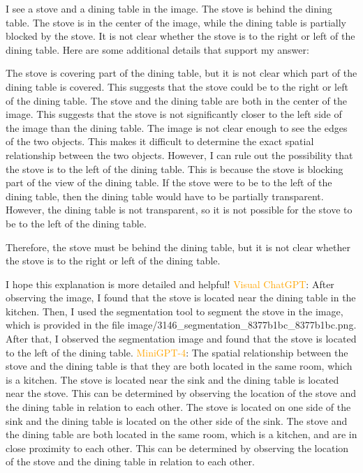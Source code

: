 \begin{enumerate}
    I see a stove and a dining table in the image.
    The stove is behind the dining table.
    The stove is in the center of the image, while the dining table is partially blocked by the stove.
    It is not clear whether the stove is to the right or left of the dining table.
    Here are some additional details that support my answer:
    
    The stove is covering part of the dining table, but it is not clear which part of the dining table is covered. This suggests that the stove could be to the right or left of the dining table.
    The stove and the dining table are both in the center of the image. This suggests that the stove is not significantly closer to the left side of the image than the dining table.
    The image is not clear enough to see the edges of the two objects. This makes it difficult to determine the exact spatial relationship between the two objects.
    However, I can rule out the possibility that the stove is to the left of the dining table. This is because the stove is blocking part of the view of the dining table. If the stove were to be to the left of the dining table, then the dining table would have to be partially transparent. However, the dining table is not transparent, so it is not possible for the stove to be to the left of the dining table.
    
    Therefore, the stove must be behind the dining table, but it is not clear whether the stove is to the right or left of the dining table.
    
    I hope this explanation is more detailed and helpful!
    \subitem \textcolor{orange}{Visual ChatGPT}: After observing the image, I found that the stove is located near the dining table in the kitchen. Then, I used the segmentation tool to segment the stove in the image, which is provided in the file image/3146\_segmentation\_8377b1bc\_8377b1bc.png. After that, I observed the segmentation image and found that the stove is located to the left of the dining table.
    \subitem \textcolor{orange}{MiniGPT-4}: The spatial relationship between the stove and the dining table is that they are both located in the same room, which is a kitchen. The stove is located near the sink and the dining table is located near the stove. This can be determined by observing the location of the stove and the dining table in relation to each other. The stove is located on one side of the sink and the dining table is located on the other side of the sink. The stove and the dining table are both located in the same room, which is a kitchen, and are in close proximity to each other. This can be determined by observing the location of the stove and the dining table in relation to each other.
\end{enumerate}
